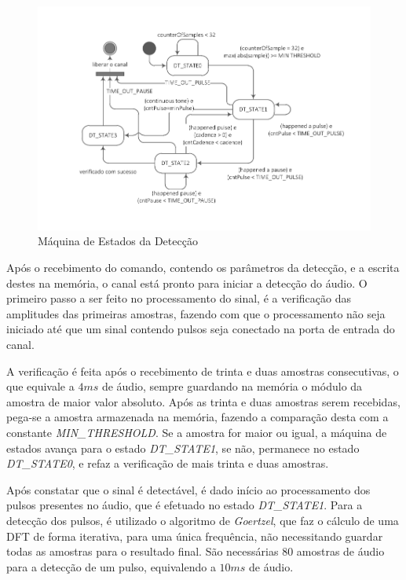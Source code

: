 \documentclass[monografia]{subfiles}
\begin{document}
				\begin{figure}[!h]
				\centering
				\includegraphics[scale=1.15]{img/stateMachines/dtState.pdf}
				\caption{Máquina de Estados da Detecção}
				\label{fig:detectionStatemachine}
				\end{figure}

				\label{sec:dtState0Section}	
				Após o recebimento do comando, contendo os parâmetros da detecção, e a escrita destes na memória, o canal está pronto para iniciar a detecção 
				do áudio. O primeiro passo a ser feito no processamento do sinal, é a verificação das amplitudes das primeiras amostras, fazendo com que o
				processamento não seja iniciado até que um sinal contendo pulsos seja conectado na porta de entrada do canal.

				A verificação é feita após o recebimento de trinta e duas amostras consecutivas, o que equivale a $4 ms$ de áudio, sempre guardando na memória o módulo
				da amostra de maior valor absoluto. Após as trinta e duas amostras serem recebidas, pega-se a amostra armazenada na memória, fazendo a comparação desta 
				com a constante \textit{MIN\_THRESHOLD}. Se a amostra for maior ou igual, a máquina de estados avança para o estado  \textit{DT\_STATE1}, se não,
				permanece no estado  \textit{DT\_STATE0}, e refaz a verificação de mais trinta e duas amostras.
			
				\label{sec:dtState1Section}
				Após constatar que o sinal é detectável, é dado início ao processamento dos pulsos presentes no áudio, que é efetuado no estado
				\textit{DT\_STATE1}. Para a detecção dos pulsos, é utilizado o algoritmo de \textit{Goertzel}, que faz o cálculo de uma DFT de forma iterativa,
				para uma única frequência, não necessitando guardar todas as amostras para o resultado final.	
				São necessárias 80 amostras de áudio para a detecção de um pulso, equivalendo a $10 ms$ de áudio. 
\end{document}
